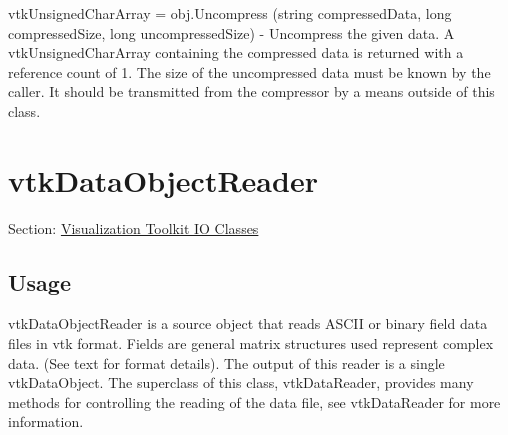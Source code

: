 \begin{DoxyItemize}
\item {\ttfamily vtk\-Unsigned\-Char\-Array = obj.\-Uncompress (string compressed\-Data, long compressed\-Size, long uncompressed\-Size)} -\/ Uncompress the given data. A vtk\-Unsigned\-Char\-Array containing the compressed data is returned with a reference count of 1. The size of the uncompressed data must be known by the caller. It should be transmitted from the compressor by a means outside of this class.  
\end{DoxyItemize}\hypertarget{vtkio_vtkdataobjectreader}{}\section{vtk\-Data\-Object\-Reader}\label{vtkio_vtkdataobjectreader}
Section\-: \hyperlink{sec_vtkio}{Visualization Toolkit I\-O Classes} \hypertarget{vtkwidgets_vtkxyplotwidget_Usage}{}\subsection{Usage}\label{vtkwidgets_vtkxyplotwidget_Usage}
vtk\-Data\-Object\-Reader is a source object that reads A\-S\-C\-I\-I or binary field data files in vtk format. Fields are general matrix structures used represent complex data. (See text for format details). The output of this reader is a single vtk\-Data\-Object. The superclass of this class, vtk\-Data\-Reader, provides many methods for controlling the reading of the data file, see vtk\-Data\-Reader for more information.

